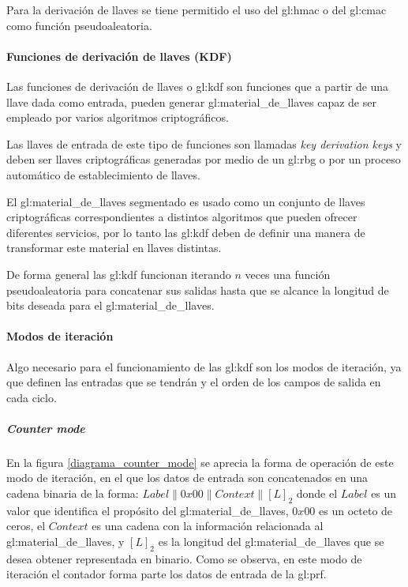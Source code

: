 Para la derivación de llaves se tiene permitido el uso del \gls{gl:hmac} o 
del \gls{gl:cmac} como función pseudoaleatoria.

\paragraph{Funciones de derivación de llaves (KDF)}

Las funciones de derivación de llaves o \gls{gl:kdf} son funciones que a 
partir de una llave dada como entrada, pueden generar 
\gls{gl:material_de_llaves} capaz de ser empleado por varios algoritmos 
criptográficos. 

Las llaves de entrada de este tipo de funciones son llamadas \textit{key 
derivation keys} y deben ser llaves criptográficas generadas por medio de un 
\gls{gl:rbg} o por un proceso automático de establecimiento de llaves.

El \gls{gl:material_de_llaves} segmentado es usado como un conjunto de llaves 
criptográficas correspondientes a distintos algoritmos que pueden ofrecer 
diferentes servicios, por lo tanto las \gls{gl:kdf} deben de definir una 
manera de transformar este material en llaves distintas.

De forma general las \gls{gl:kdf} funcionan iterando $n$ veces una función 
pseudoaleatoria para concatenar sus salidas hasta que se alcance la longitud 
de bits deseada para el \gls{gl:material_de_llaves}.

\paragraph{Modos de iteración}

Algo necesario para el funcionamiento de las \gls{gl:kdf} son los modos de 
iteración, ya que definen las entradas que se tendrán y el orden de los campos 
de salida en cada ciclo.

\subparagraph{Counter mode}
En la figura \ref{diagrama_counter_mode} se aprecia la forma de operación de 
este modo de iteración, en el que los datos de entrada son concatenados en una 
cadena binaria de la forma: $Label \parallel 0x00 \parallel Context \parallel 
{[L]}_2$ donde el $Label$ es un valor que identifica el propósito del 
\gls{gl:material_de_llaves}, $0x00$ es un octeto de ceros, el $Context$ es una 
cadena con la información relacionada al \gls{gl:material_de_llaves}, y 
${[L]}_2$ es la longitud del \gls{gl:material_de_llaves} que se desea obtener 
representada en binario. Como se observa, en este modo de iteración el 
contador forma parte los datos de entrada de la \gls{gl:prf}.

